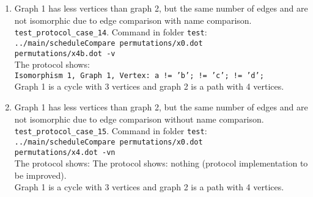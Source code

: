 \documentclass[12pt,a4paper]{report}
\begin{document}
\begin{enumerate}
{    compare: -1, key: par, value1: '', value2: '1'. \\
    compare: -1, key: par, value1: '', value2: '1'.} \\
    Graph 1 is a cycle with 3 vertices and graph 2 is a path with 4 vertices.
    Vertices in graph 2 have a parameter value 1. Vertices in graph 1 have no parameter.
  \item Graph 1 has less vertices than graph 2, but the same number of edges and are not isomorphic due to edge comparison with name comparison.
    \texttt{test\_protocol\_case\_14}. Command in folder \texttt{test}: \\
    \texttt{../main/scheduleCompare permutations/x0.dot \\ permutations/x4b.dot -v} \\
    The protocol shows: \\
    \texttt{Isomorphism 1, Graph 1, Vertex: a != 'b'; != 'c'; != 'd';} \\
    Graph 1 is a cycle with 3 vertices and graph 2 is a path with 4 vertices.
  \item Graph 1 has less vertices than graph 2, but the same number of edges and are not isomorphic due to edge comparison without name comparison.
    \texttt{test\_protocol\_case\_15}. Command in folder \texttt{test}: \\
    \texttt{../main/scheduleCompare permutations/x0.dot \\ permutations/x4.dot -vn} \\
    The protocol shows: The protocol shows: nothing (protocol implementation to be improved).\\
    Graph 1 is a cycle with 3 vertices and graph 2 is a path with 4 vertices.


\end{enumerate}
\end{document}
